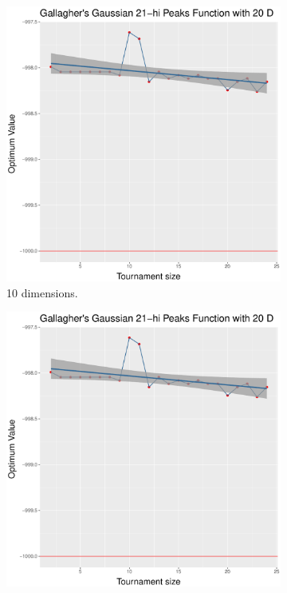 \begin{figure}[t]
	\begin{subfigure}[b]{0.33\textwidth}
		\centering
		\includegraphics[width=\textwidth]{img/multimodal_sbx_22_dim_20.pdf}
		\caption{10 dimensions.}
	\end{subfigure}
	\begin{subfigure}[b]{0.33\textwidth}
		\centering
		\includegraphics[width=\textwidth]{img/multimodal_sbx_22_dim_20.pdf}

\end{subfigure}
\end{figure}
